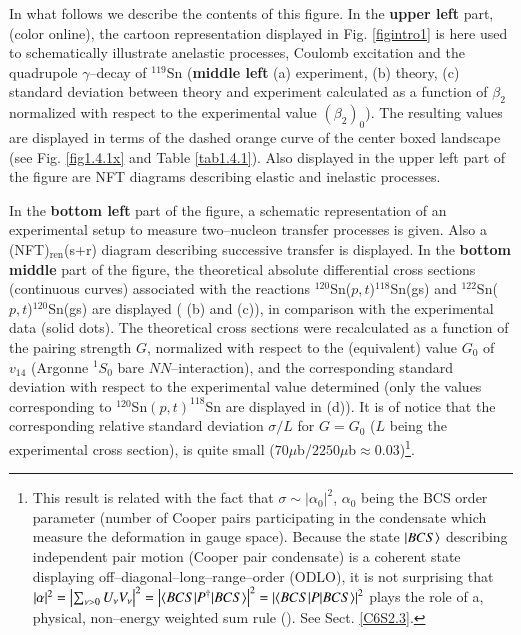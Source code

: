   
  In what follows we describe the contents of this figure. In the \textbf{upper left} part, (color online), the cartoon representation displayed in Fig. \ref{figintro1} is here used to schematically illustrate  anelastic processes, Coulomb excitation and the quadrupole $\gamma$--decay of $^{119}$Sn (\textbf{middle left} (a) experiment, (b) theory, (c) standard deviation between theory and experiment calculated as a function of $\beta_2$ normalized with respect to the experimental value $(\beta_2)_0$). The resulting  values are displayed in terms of the dashed orange curve of the center boxed landscape (see Fig. \ref{fig1.4.1x} and Table \ref{tab1.4.1}). Also displayed in the upper left part of the figure are NFT diagrams describing elastic and inelastic processes.
  
  
  In the \textbf{bottom left} part of the figure, a schematic representation of an experimental setup to measure   two--nucleon transfer processes is given. Also a (NFT)$_{\text{ren}}$(s+r) diagram describing  successive transfer is displayed. In the \textbf{bottom middle} part of the figure, the theoretical absolute differential cross sections (continuous curves) associated with the reactions $^{120}$Sn($p,t$)$^{118}$Sn(gs) and $^{122}$Sn($p,t$)$^{120}$Sn(gs) are displayed ( (b) and (c)), in comparison with the experimental data (solid dots). The theoretical cross sections were recalculated as a function of the pairing strength $G$, normalized with respect to the (equivalent) value $G_0$ of $v_{14}$ (Argonne $^1S_0$ bare $NN$--interaction), and the corresponding standard deviation with respect to the experimental value determined (only the values corresponding to $^{120}$Sn$(p,t)^{118}$Sn are displayed in (d)). It is of notice that the corresponding relative standard deviation $\sigma/L$ for $G=G_0$  ($L$ being the experimental cross section),  is quite small ($70\mu$b/$2250\mu$b$\approx0.03$)\footnote{This result is related with the fact that $\sigma\sim|\alpha_0|^2$, $\alpha_0$ being the BCS order parameter (number of Cooper pairs participating in the condensate which measure the deformation in gauge space). Because the state $|{BCS} \rangle$ describing independent pair motion (Cooper pair condensate) is a coherent state displaying off--diagonal--long--range--order (ODLO), it is not surprising that $|\alpha|^2=\left|\sum_{\nu>0}U_\nu V_\nu\right|^2=\left|\langle {BCS|P^\dagger|BCS} \rangle\right|^2=\left|\langle {BCS|P|BCS} \rangle\right|^2$ plays the role of a, physical, non--energy weighted sum rule (\cite{Potel:17}). See Sect. \ref{C6S2.3}.}.
  
